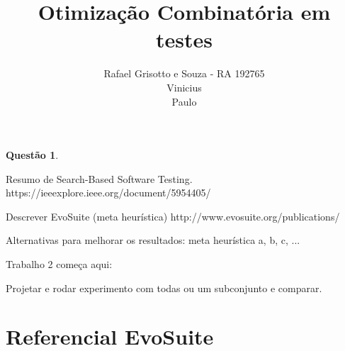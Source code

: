 \documentclass[12pt,a4paper]{article}
\title{Otimização Combinatória em  \\ testes}
\author{Rafael Grisotto e Souza - RA 192765\\ Vinicius \\ Paulo}
\newtheorem{questao}{Questão}
\begin{document}
\maketitle


\begin{questao}
\end{questao}

Resumo de Search-Based Software Testing.
https://ieeexplore.ieee.org/document/5954405/

Descrever EvoSuite (meta heurística)
http://www.evosuite.org/publications/

Alternativas para melhorar os resultados: meta heurística a, b, c, ...


Trabalho 2 começa aqui:

Projetar e rodar experimento com todas ou um subconjunto e comparar.





\newpage

\section{Referencial EvoSuite}
\end{document}
